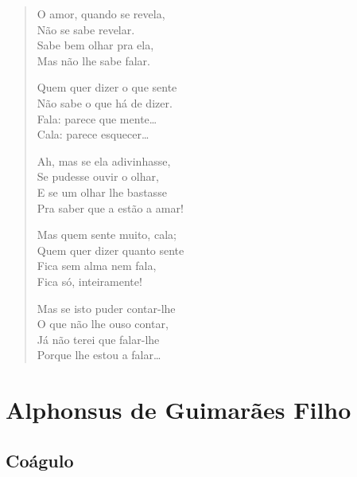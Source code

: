 \documentclass[10pt,a5paper,oneside]{book}
\begin{document}
\begin{verse}
O amor, quando se revela,\\
Não se sabe revelar.\\
Sabe bem olhar pra ela,\\
Mas não lhe sabe falar.

Quem quer dizer o que sente\\
Não sabe o que há de dizer.\\
Fala: parece que mente\ldots{}\\
Cala: parece esquecer\ldots{}

Ah, mas se ela adivinhasse,\\
Se pudesse ouvir o olhar,\\
E se um olhar lhe bastasse\\
Pra saber que a estão a amar!

Mas quem sente muito, cala;\\
Quem quer dizer quanto sente\\
Fica sem alma nem fala,\\
Fica só, inteiramente!

Mas se isto puder contar-lhe\\
O que não lhe ouso contar,\\
Já não terei que falar-lhe\\
Porque lhe estou a falar\ldots{}
\end{verse}

\part{Alphonsus de Guimarães Filho}

\chapter{Coágulo}
\end{document}
